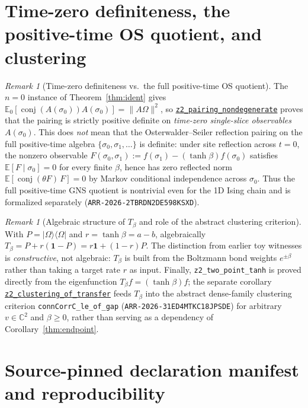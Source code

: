 \documentclass[11pt]{article}
\theoremstyle{remark}
\newtheorem{remark}[theorem]{Remark}
\theoremstyle{definition}
\newcommand{\lean}[1]{\texttt{#1}}
\newcommand{\anchor}{6b54eca695e96b3038ceda18276c4e28fb45983f}
\newcommand{\osline}[3]{%
  \href{https://github.com/lluiseriksson/THE-ERIKSSON-PROGRAMME/blob/\anchor/YangMills/OS/#1.lean\#L#2}{\nolinkurl{#3}}}
\newcommand{\C}{\mathbb{C}}
\newcommand{\Om}{\Omega}
\newcommand{\Ex}{\mathbb{E}}
\newcommand{\conj}[1]{\operatorname{conj}(#1)}
\newcommand{\ket}[1]{|#1\rangle}
\newcommand{\bra}[1]{\langle #1|}
\begin{document}
\section{Time-zero definiteness, the positive-time OS quotient, and clustering}

\begin{remark}[Time-zero definiteness vs.\ the full positive-time OS quotient]\label{rem:quotient}
The $n=0$ instance of Theorem~\ref{thm:ident} gives
$\Ex_0[\conj{A(\sigma_0)}A(\sigma_0)] = \|A\Om\|^2$, so
\osline{Z2Identification}{417}{z2\_pairing\_nondegenerate} proves that the pairing is
strictly positive definite on \emph{time-zero single-slice observables} $A(\sigma_0)$.
This does \emph{not} mean that the Osterwalder--Seiler reflection pairing on the full
positive-time algebra $\{\sigma_0, \sigma_1, \dots\}$ is definite: under site reflection
across $t=0$, the nonzero observable
$F(\sigma_0,\sigma_1) := f(\sigma_1) - (\tanh\beta)f(\sigma_0)$ satisfies
$\Ex[F \mid \sigma_0] = 0$ for every finite $\beta$, hence has zero reflected norm
$\Ex[\conj{\theta F}\,F] = 0$ by Markov conditional independence across $\sigma_0$.
Thus the full positive-time GNS quotient is nontrivial even for the 1D Ising chain and is
formalized separately (\texttt{ARR-2026-2TBRDN2DE598KSXD}).
\end{remark}

\begin{remark}[Algebraic structure of $T_\beta$ and role of the abstract clustering criterion]
With $P = \ket{\Om}\bra{\Om}$ and $r = \tanh\beta = a-b$, algebraically
$T_\beta = P + r(\mathbf{1}-P) = r\mathbf{1} + (1-r)P$. The distinction from earlier toy
witnesses is \emph{constructive}, not algebraic: $T_\beta$ is built from the Boltzmann bond
weights $e^{\pm\beta}$ rather than taking a target rate $r$ as input. Finally,
\lean{z2\_two\_point\_tanh} is proved directly from the eigenfunction
$T_\beta f = (\tanh\beta)f$; the separate corollary
\osline{Z2Transfer}{301}{z2\_clustering\_of\_transfer} feeds $T_\beta$ into the abstract
dense-family clustering criterion \lean{connCorrC\_le\_of\_gap}
(\texttt{ARR-2026-31ED4MTKC18JPSDE}) for arbitrary $v \in \C^2$ and $\beta \ge 0$, rather
than serving as a dependency of Corollary~\ref{thm:endpoint}.
\end{remark}

\section{Source-pinned declaration manifest and reproducibility}
\end{document}
